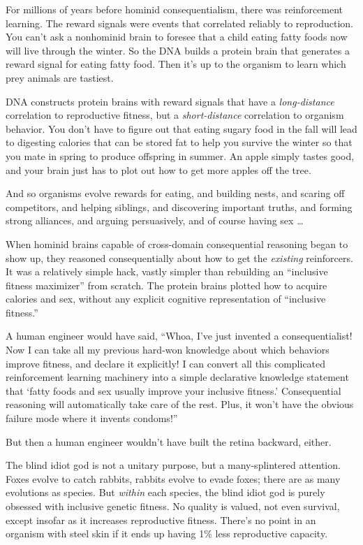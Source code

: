 {
 For millions of years before hominid consequentialism, there was
reinforcement learning. The reward signals were events that correlated
reliably to reproduction. You can't ask a nonhominid
brain to foresee that a child eating fatty foods now will live through
the winter. So the DNA builds a protein brain that generates a reward
signal for eating fatty food. Then it's up to the
organism to learn which prey animals are tastiest.}

{
 DNA constructs protein brains with reward signals that have a
\textit{long-distance} correlation to reproductive fitness, but a
\textit{short-distance} correlation to organism behavior. You
don't have to figure out that eating sugary food in the
fall will lead to digesting calories that can be stored fat to help you
survive the winter so that you mate in spring to produce offspring in
summer. An apple simply tastes good, and your brain just has to plot
out how to get more apples off the tree.}

{
 And so organisms evolve rewards for eating, and building nests,
and scaring off competitors, and helping siblings, and discovering
important truths, and forming strong alliances, and arguing
persuasively, and of course having sex \ldots}

{
 When hominid brains capable of cross-domain consequential
reasoning began to show up, they reasoned consequentially about how to
get the \textit{existing} reinforcers. It was a relatively simple hack,
vastly simpler than rebuilding an ``inclusive fitness
maximizer'' from scratch. The protein brains plotted
how to acquire calories and sex, without any explicit cognitive
representation of ``inclusive
fitness.''}

{
 A human engineer would have said, ``Whoa,
I've just invented a consequentialist! Now I can take
all my previous hard-won knowledge about which behaviors improve
fitness, and declare it explicitly! I can convert all this complicated
reinforcement learning machinery into a simple declarative knowledge
statement that `fatty foods and sex usually improve your
inclusive fitness.' Consequential reasoning will
automatically take care of the rest. Plus, it won't
have the obvious failure mode where it invents
condoms!''}

{
 But then a human engineer wouldn't have built the
retina backward, either.}

{
 The blind idiot god is not a unitary purpose, but a
many-splintered attention. Foxes evolve to catch rabbits, rabbits
evolve to evade foxes; there are as many evolutions as species. But
\textit{within} each species, the blind idiot god is purely obsessed
with inclusive genetic fitness. No quality is valued, not even
survival, except insofar as it increases reproductive fitness.
There's no point in an organism with steel skin if it
ends up having 1\% less reproductive capacity.}

